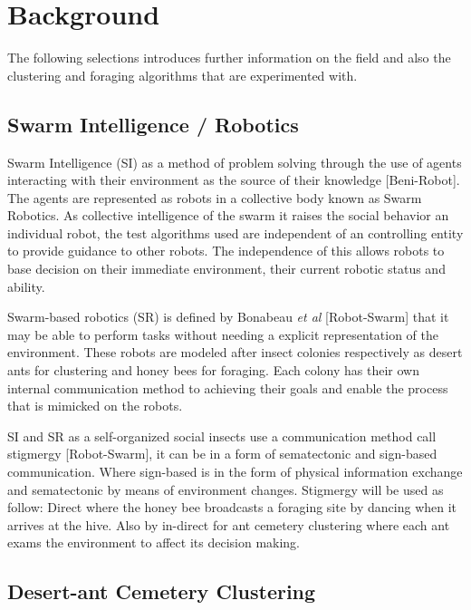 \documentclass[12pt]{article}
\begin{document}
\section*{Background}

The following selections introduces further information on the field and also the clustering and foraging algorithms that are experimented with.

\subsection*{Swarm Intelligence / Robotics}

\par{Swarm Intelligence (SI) as a method of problem solving through the use of agents interacting with their environment as the source of their knowledge [Beni-Robot]. The agents are represented as robots in a collective body known as Swarm Robotics. As collective intelligence of the swarm it raises the social behavior an individual robot, the test algorithms used are independent of an controlling entity to provide guidance to other robots. The independence of this allows robots to base decision on their immediate environment, their current robotic status and ability.}
\\
\par{Swarm-based robotics (SR) is defined by Bonabeau \textit{et al} [Robot-Swarm] that it may be able to perform tasks without needing a explicit representation of the environment. These robots are modeled after insect colonies respectively as desert ants for clustering and honey bees for foraging. Each colony has their own internal communication method to achieving their goals and enable the process that is mimicked on the robots.}
\\
\par{SI and SR as a self-organized social insects use a communication method call stigmergy [Robot-Swarm], it can be in a form of sematectonic and sign-based communication. Where sign-based is in the form of physical information exchange and sematectonic by means of environment changes. Stigmergy will be used as follow: Direct where the honey bee broadcasts a foraging site by dancing when it arrives at the hive. Also by in-direct for ant cemetery clustering where each ant exams the environment to affect its decision making.}

\subsection*{Desert-ant Cemetery Clustering}
\end{document}

